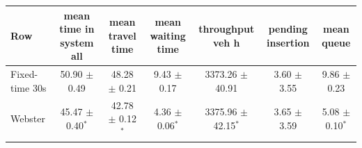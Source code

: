 \begin{tabular}{lcccccc}
\toprule
Row & mean time in system all & mean travel time & mean waiting time & throughput veh h & pending insertion & mean queue \\
\midrule
Fixed-time 30s & 50.90 $\pm$ 0.49 & 48.28 $\pm$ 0.21 & 9.43 $\pm$ 0.17 & 3373.26 $\pm$ 40.91 & 3.60 $\pm$ 3.55 & 9.86 $\pm$ 0.23 \\
Webster & 45.47 $\pm$ 0.40$^{*}$ & 42.78 $\pm$ 0.12$^{*}$ & 4.36 $\pm$ 0.06$^{*}$ & 3375.96 $\pm$ 42.15$^{*}$ & 3.65 $\pm$ 3.59 & 5.08 $\pm$ 0.10$^{*}$ \\
\bottomrule
\end{tabular}
